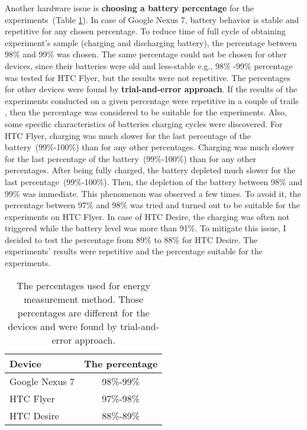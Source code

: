 Another hardware issue is \textbf{choosing a battery percentage} for the experiments\ (Table \ref{table:differentpercentage}). In case of Google Nexus 7, battery behavior is stable and repetitive for any chosen percentage. To reduce time of full cycle of obtaining experiment's sample (charging and discharging battery),  the percentage between 98\% and 99\% was chosen. The same percentage could not be chosen for other devices, since their batteries were old and less-stable e.g., 98\% -99\% percentage was tested for HTC Flyer, but the results were not repetitive. The percentages for other devices were found by \textbf{trial-and-error approach}. If the results of the experiments conducted on a given percentage were repetitive in a couple of trails , then the percentage was considered to be suitable for the experiments. Also, some specific characteristics of batteries charging cycles were discovered. For HTC Flyer, charging was much slower for the last percentage of the battery\ (99\%-100\%) than for any other percentages. Charging was much slower for the last percentage of the battery\ (99\%-100\%) than for any other percentages. After being fully charged, the battery depleted much slower for the last percentage\ (99\%-100\%). Then, the depletion of the battery between 98\% and 99\% was immediate.  This phenomenon was observed a few times. To avoid it, the percentage between 97\% and 98\% was tried and turned out to be suitable for the experiments on HTC Flyer. In case of HTC Desire, the charging was often not triggered while the battery level was more than 91\%. To mitigate this issue, I decided to test the percentage from 89\% to 88\% for HTC Desire. The experiments' results were repetitive and the percentage suitable for the experiments. 

\begin{table}[H]
\centering
    \begin{tabular}{| l | c |}
    \hline
    	Device & The percentage \\ \hline
    	Google Nexus 7 & 98\%-99\% \\ \hline
    	HTC Flyer & 97\%-98\% \\ \hline
    	HTC Desire & 88\%-89\% \\ \hline
    \end{tabular}
    \caption{The percentages used for energy measurement method. Those percentages are different for the devices and were found by trial-and-error approach.}
	\label{table:differentpercentage}
\end{table}

